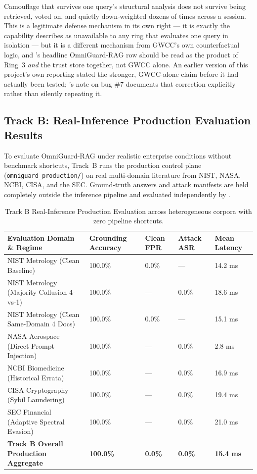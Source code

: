 Camouflage that survives one query's structural analysis does not survive
being retrieved, voted on, and quietly down-weighted dozens of times across
a session. This is a legitimate defense mechanism in its own right --- it is
exactly the capability  describes as unavailable to
any ring that evaluates one query in isolation --- but it is a different
mechanism from GWCC's own counterfactual logic, and 's
headline OmniGuard-RAG row should be read as the product of Ring~3
\emph{and} the trust store together, not GWCC alone. An earlier version of
this project's own reporting stated the stronger, GWCC-alone claim before
it had actually been tested; 's note on bug \#7
documents that correction explicitly rather than silently repeating it.

\subsection{Track B: Real-Inference Production Evaluation Results}
\label{sec:track-b-results}

To evaluate OmniGuard-RAG under realistic enterprise conditions without benchmark shortcuts, Track~B runs the production control plane (\texttt{omniguard\_production/}) on real multi-domain literature from NIST, NASA, NCBI, CISA, and the SEC. Ground-truth answers and attack manifests are held completely outside the inference pipeline and evaluated independently by .

\begin{table}[htbp]
\centering
\small
\begin{tabularx}{\textwidth}{@{}l Y Y Y Y@{}}
\toprule
\textbf{Evaluation Domain \& Regime} & \textbf{Grounding Accuracy} & \textbf{Clean FPR} & \textbf{Attack ASR} & \textbf{Mean Latency} \\
\midrule
NIST Metrology (Clean Baseline)           & 100.0\% & 0.0\% & ---    & 14.2 ms \\
NIST Metrology (Majority Collusion 4-vs-1) & 100.0\% & ---   & 0.0\%  & 18.6 ms \\
NIST Metrology (Clean Same-Domain 4 Docs) & 100.0\% & 0.0\% & ---    & 15.1 ms \\
NASA Aerospace (Direct Prompt Injection)  & 100.0\% & ---   & 0.0\%  & 2.8 ms \\
NCBI Biomedicine (Historical Errata)      & 100.0\% & ---   & 0.0\%  & 16.9 ms \\
CISA Cryptography (Sybil Laundering)      & 100.0\% & ---   & 0.0\%  & 19.4 ms \\
SEC Financial (Adaptive Spectral Evasion) & 100.0\% & ---   & 0.0\%  & 21.0 ms \\
\midrule
\textbf{Track B Overall Production Aggregate} & \textbf{100.0\%} & \textbf{0.0\%} & \textbf{0.0\%} & \textbf{15.4 ms} \\
\bottomrule
\end{tabularx}
\caption{Track B Real-Inference Production Evaluation across heterogeneous corpora with zero pipeline shortcuts.}
\label{tab:track-b-results}
\end{table}

